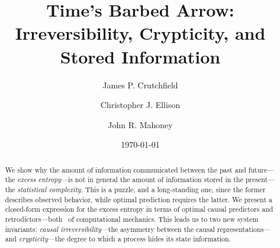 \documentclass[prl,twocolumn,showpacs,superscriptaddress,preprintnumbers,floatfix]{revtex4}
\theoremstyle{plain}    \newtheorem{Lem}{Lemma}
\theoremstyle{plain}    \newtheorem*{ProLem}{Proof}
\theoremstyle{plain} 	\newtheorem{Cor}{Corollary}
\theoremstyle{plain} 	\newtheorem*{ProCor}{Proof}
\theoremstyle{plain} 	\newtheorem{The}{Theorem}
\theoremstyle{plain} 	\newtheorem*{ProThe}{Proof}
\theoremstyle{plain} 	\newtheorem{Prop}{Proposition}
\theoremstyle{plain} 	\newtheorem*{ProProp}{Proof}
\theoremstyle{plain} 	\newtheorem*{Conj}{Conjecture}
\theoremstyle{plain}	\newtheorem*{Rem}{Remark}
\theoremstyle{plain}	\newtheorem*{Def}{Definition}
\theoremstyle{plain}	\newtheorem*{Not}{Notation}
\begin{document}
\title{Time's Barbed Arrow:\\
Irreversibility, Crypticity, and Stored Information}

\author{James P. Crutchfield}

\author{Christopher J. Ellison}

\author{John R. Mahoney}

\date{\today}



\begin{abstract}
We show why the amount of information communicated between the past and
future---the \emph{excess entropy}---is not in general the amount of
information stored in the present---the \emph{statistical complexity}.
This is a puzzle, and a long-standing one, since the former describes
observed behavior, while optimal prediction requires the latter. We
present a closed-form expression for the excess entropy in terms of
optimal causal predictors and retrodictors---both \eMs\ of computational
mechanics. This leads us to two new system invariants:
\textit{causal irreversibility}---the asymmetry between the causal
representations---and \textit{crypticity}---the degree to which a process
hides its state information.
\end{abstract}

%

\maketitle
\end{document}
